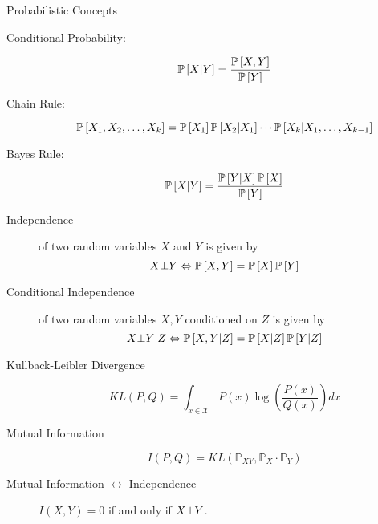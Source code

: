 \begin{frame}{Probabilistic Concepts}
\begin{description}
    \item[Conditional Probability:]
    \begin{equation}
        \Pb[X|Y] = \frac{\Pb[X,Y]}{\Pb[Y]}
    \end{equation}
    \item[Chain Rule:]
    \begin{equation}
        \Pb[X_1,X_2,\ldots,X_k] = \Pb[X_1] \Pb[X_2 | X_1] \cdots \Pb[X_k | X_1,\ldots,X_{k-1}]
    \end{equation}
    \item[Bayes Rule:]
\begin{equation}
    \Pb[X|Y] = \frac{\Pb[Y|X]\Pb[X]}{\Pb[Y]}
\end{equation}
\item[Independence] of two random variables $X$ and $Y$ is given by
\begin{equation}
    X \indep Y \Leftrightarrow \Pb[X,Y] = \Pb[X] \Pb[Y]
\end{equation}
\item[Conditional Independence] of two random variables $X,Y$ conditioned on $Z$ is given by
\begin{equation}
    X \indep Y | Z \Leftrightarrow \Pb[X,Y|Z] = \Pb[X|Z] \Pb[Y|Z]
\end{equation}
\item[Kullback-Leibler Divergence]
\begin{equation}
KL(P,Q) = \int_{x \in \mathcal{X}} P(x) \log\left(\frac{P(x)}{Q(x)}\right) dx
\end{equation}
\item[Mutual Information]
\begin{equation}
I(P,Q) = KL(\mathbb{P}_{XY}, \mathbb{P}_X \cdot \mathbb{P}_Y)
\end{equation}
\item[Mutual Information $\leftrightarrow$ Independence] $I(X,Y) = 0$ if and only if $X \bot Y$.
\end{description}
\end{frame}

